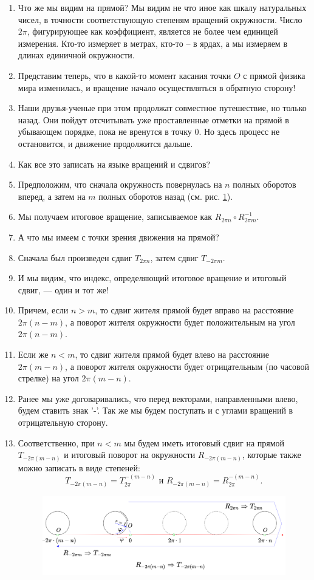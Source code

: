 \begin{enumerate}
\item Что же мы видим на прямой? Мы видим не что иное как шкалу натуральных чисел, в точности соответствующую степеням вращений окружности. Число $2\pi$, фигурирующее как коэффициент, является не более чем единицей измерения. Кто-то измеряет в метрах, кто-то -- в ярдах, а мы измеряем в длинах единичной окружности.
\item Представим теперь, что в какой-то момент касания точки $O$ с прямой физика мира изменилась, и вращение начало осуществляться в обратную сторону!
\item Наши друзья-ученые при этом продолжат совместное путешествие, но только назад. Они пойдут отсчитывать уже проставленные отметки на прямой в убывающем порядке, пока не вренутся в точку 0. Но здесь процесс не остановится, и движение продолжится дальше.
\item Как все это записать на языке вращений и сдвигов?
\item Предположим, что сначала окружность повернулась на $n$ полных оборотов вперед, а затем на $m$ полных оборотов назад (см. рис. \ref{RundLine1}).
\item Мы получаем итоговое вращение, записываемое как $R_{2\pi n}\circ R_{2\pi m}^{-1}$.
\item А что мы имеем с точки зрения движения на прямой?
\item Сначала был произведен сдвиг $T_{2\pi n}$, затем сдвиг $T_{-2\pi m}$.
\item И мы видим, что индекс, определяющий итоговое вращение и итоговый сдвиг, --- один и тот же!
\item Причем, если $n>m$, то сдвиг жителя прямой будет вправо на расстояние $2\pi(n-m)$, а поворот жителя окружности будет положительным на угол $2\pi(n-m)$.
\item Если же $n<m$, то сдвиг жителя прямой будет влево на расстояние $2\pi(m-n)$, а поворот жителя окружности будет отрицательным (по часовой стрелке) на угол $2\pi(m-n)$.
\item Ранее мы уже договаривались, что перед векторами, направленными влево, будем ставить знак '-'. Так же мы будем поступать и с углами вращений в отрицательную сторону.
\item Соответственно, при $n<m$ мы будем иметь итоговый сдвиг на прямой $T_{-2\pi(m-n)}$ и итоговый поворот на окружности $R_{-2\pi(m-n)}$, которые также можно записать в виде степеней:
$$
T_{-2\pi(m-n)}=T_{2\pi}^{-(m-n)}\mbox{ и }R_{-2\pi(m-n)}=R_{2\pi}^{-(m-n)}.
$$

\begin{figure}[hbt!]
\begin{center}
\includegraphics[scale=0.15]{RundLine1.png}
\end{center}
\caption{}\label{RundLine1}
\end{figure}


\end{enumerate}
